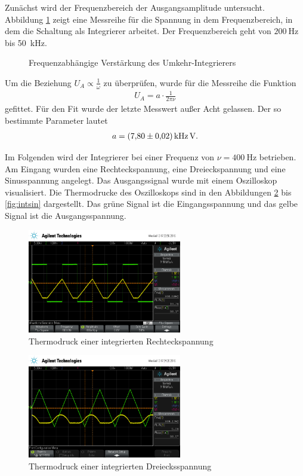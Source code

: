 Zunächst wird der Frequenzbereich der Ausgangsamplitude untersucht.
Abbildung \ref{fig:plotint} zeigt eine Messreihe für die Spannung in dem Frequenzbereich, in dem die Schaltung als Integrierer arbeitet.
Der Frequenzbereich geht von $\SI{200}{\hertz}$ bis \SI{50}{\kilo \hertz}.
\begin{figure}
	\centering
	\resizebox{\pltwidth}{!}{
		
	}
	\caption{Frequenzabhängige Verstärkung des Umkehr-Integrierers}
	\label{fig:plotint}
\end{figure}
Um die Beziehung $U_A \propto \frac{1}{\omega}$ zu überprüfen, wurde für die Messreihe die Funktion 
\begin{align}
	U_A = a \cdot \frac{1}{2 \pi \nu}
\end{align}
gefittet.
Für den Fit wurde der letzte Messwert außer Acht gelassen.
Der so bestimmte Parameter lautet
\begin{align}
	a = \SI{7.8 \pm 0.02}{\kilo \hertz \volt}. 
\end{align}

Im Folgenden wird der Integrierer bei einer Frequenz von $\nu = \SI{400}{\hertz}$ betrieben.
Am Eingang wurden eine Rechteckspannung, eine Dreieckspannung und eine Sinusspannung angelegt.
Das Ausgangssignal wurde mit einem Oszilloskop visualisiert.
Die Thermodrucke des Oszilloskops sind in den Abbildungen \ref{fig:intrechteck} bis \ref{fig:intsin} dargestellt.
Das grüne Signal ist die Eingangsspannung und das gelbe Signal ist die Ausgangsspannung.

\begin{figure}
	\centering
	\includegraphics[width=0.6\textwidth]{img/scope_1_int_rechteck.png}
	\caption{Thermodruck einer integrierten Rechteckspannung}
	\label{fig:intrechteck}
\end{figure}

\begin{figure}
	\centering
	\includegraphics[width=0.6\textwidth]{img/scope_2_int_dreieck.png}
	\caption{Thermodruck einer integrierten Dreiecksspannung}
	\label{fig:intdreieck}
\end{figure}

